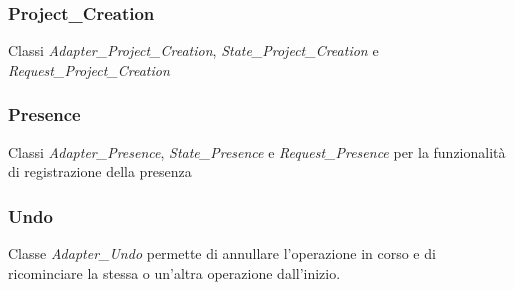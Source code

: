 \subsubsection{Project\_Creation} Classi \textit{Adapter\_Project\_Creation}, \textit{State\_Project\_Creation} e \textit{Request\_Project\_Creation}
\subsubsection{Presence} Classi \textit{Adapter\_Presence}, \textit{State\_Presence} e \textit{Request\_Presence} per la funzionalità di registrazione della presenza
\subsubsection{Undo} Classe \textit{Adapter\_Undo} permette di annullare l'operazione in corso e di ricominciare la stessa o un'altra operazione dall'inizio.
